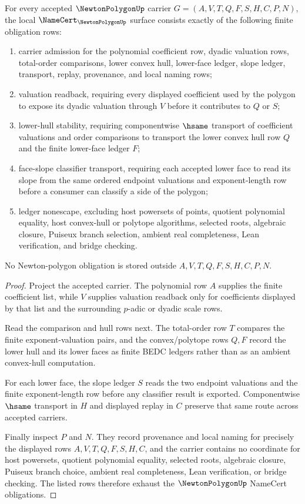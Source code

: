 \begin{theorem}
\label{thm:newton-polygon-namecert-obligations}
For every accepted $\NewtonPolygonUp$ carrier $G=(A,V,T,Q,F,S,H,C,P,N)$, the local $\NameCert_{\NewtonPolygonUp}$ surface consists exactly of the following finite obligation rows:
\begin{enumerate}
\item carrier admission for the polynomial coefficient row, dyadic valuation rows, total-order comparisons, lower convex hull, lower-face ledger, slope ledger, transport, replay, provenance, and local naming rows;
\item valuation readback, requiring every displayed coefficient used by the polygon to expose its dyadic valuation through $V$ before it contributes to $Q$ or $S$;
\item lower-hull stability, requiring componentwise $\hsame$ transport of coefficient valuations and order comparisons to transport the lower convex hull row $Q$ and the finite lower-face ledger $F$;
\item face-slope classifier transport, requiring each accepted lower face to read its slope from the same ordered endpoint valuations and exponent-length row before a consumer can classify a side of the polygon;
\item ledger nonescape, excluding host powersets of points, quotient polynomial equality, host convex-hull or polytope algorithms, selected roots, algebraic closure, Puiseux branch selection, ambient real completeness, Lean verification, and bridge checking.
\end{enumerate}
No Newton-polygon obligation is stored outside $A,V,T,Q,F,S,H,C,P,N$.
\end{theorem}
\begin{proof}
Project the accepted carrier. The polynomial row $A$ supplies the finite coefficient list, while $V$ supplies valuation readback only for coefficients displayed by that list and the surrounding $p$-adic or dyadic scale rows.

Read the comparison and hull rows next. The total-order row $T$ compares the finite exponent-valuation pairs, and the convex/polytope rows $Q,F$ record the lower hull and its lower faces as finite BEDC ledgers rather than as an ambient convex-hull computation.

For each lower face, the slope ledger $S$ reads the two endpoint valuations and the finite exponent-length row before any classifier result is exported. Componentwise $\hsame$ transport in $H$ and displayed replay in $C$ preserve that same route across accepted carriers.

Finally inspect $P$ and $N$. They record provenance and local naming for precisely the displayed rows $A,V,T,Q,F,S,H,C$, and the carrier contains no coordinate for host powersets, quotient polynomial equality, selected roots, algebraic closure, Puiseux branch choice, ambient real completeness, Lean verification, or bridge checking. The listed rows therefore exhaust the $\NewtonPolygonUp$ NameCert obligations.
\end{proof}

